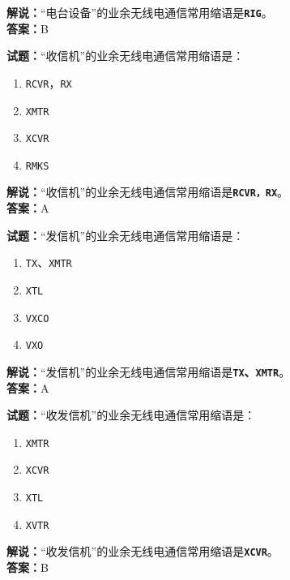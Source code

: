 \documentclass{ctexbook}
\begin{document}
\noindent\textbf{解说：}“电台设备”的业余无线电通信常用缩语是\texttt{\textbf{RIG}}。\\\noindent\textbf{答案：}B

\vspace{\baselineskip}

\noindent\textbf{试题：}“收信机”的业余无线电通信常用缩语是：

\begin{enumerate}[leftmargin=3em]
  \item \texttt{RCVR}，\texttt{RX}
  \item \texttt{XMTR}
  \item \texttt{XCVR}
  \item \texttt{RMKS}
\end{enumerate}

\noindent\textbf{解说：}“收信机”的业余无线电通信常用缩语是\texttt{\textbf{RCVR，RX}}。\\\noindent\textbf{答案：}A

\vspace{\baselineskip}

\noindent\textbf{试题：}“发信机”的业余无线电通信常用缩语是：

\begin{enumerate}[leftmargin=3em]
  \item \texttt{TX}、\texttt{XMTR}
  \item \texttt{XTL}
  \item \texttt{VXCO}
  \item \texttt{VXO}
\end{enumerate}

\noindent\textbf{解说：}“发信机”的业余无线电通信常用缩语是\textbf{\texttt{TX}、\texttt{XMTR}}。\\\noindent\textbf{答案：}A

\vspace{\baselineskip}

\noindent\textbf{试题：}“收发信机”的业余无线电通信常用缩语是：

\begin{enumerate}[leftmargin=3em]
  \item \texttt{XMTR}
  \item \texttt{XCVR}
  \item \texttt{XTL}
  \item \texttt{XVTR}
\end{enumerate}

\noindent\textbf{解说：}“收发信机”的业余无线电通信常用缩语是\texttt{\textbf{XCVR}}。\\\noindent\textbf{答案：}B
\end{document}
